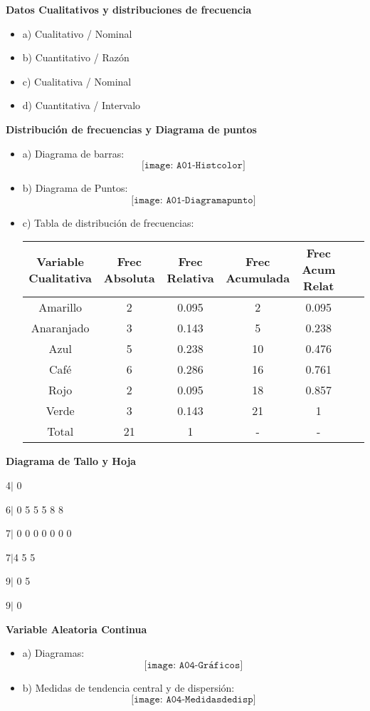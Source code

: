 \documentclass{../oxmathproblems}
\begin{document}
\begin{questions}
\miquestion \textbf{Datos Cualitativos y distribuciones de frecuencia}

\begin{itemize}
\item  a) Cualitativo / Nominal 
\item  b) Cuantitativo / Razón
\item  c) Cualitativa / Nominal 
\item  d) Cuantitativa / Intervalo
\end{itemize}

\miquestion \textbf {Distribución de frecuencias y Diagrama de puntos}

\begin{itemize}
\item  a) Diagrama de barras: 
$$\texttt{[image: A01-Histcolor]}$$
\item  b) Diagrama de Puntos: 
$$\texttt{[image: A01-Diagramapunto]}$$
\newpage
\item  c) Tabla de distribución de frecuencias: 
\begin{center}
\begin{tabular}{ |c|c|c|c|c|c|c|} 
\hline
Variable Cualitativa & Frec Absoluta & Frec Relativa & Frec Acumulada & Frec Acum Relat   \\
\hline
Amarillo &2 &0.095 & 2 & 0.095\\
Anaranjado &3& 0.143 & 5 & 0.238\\
Azul  & 5  & 0.238  & 10 & 0.476\\
Café & 6 & 0.286 &  16 &0.761\\
Rojo & 2 & 0.095 & 18 & 0.857\\
Verde & 3 & 0.143 & 21 & 1 \\
Total & 21 & 1 &- & - \\
\hline
\end{tabular}
\end{center}
\end{itemize}

\miquestion \textbf { Diagrama de Tallo y Hoja} 

4$\mid$ 0 

6$\mid$ 0 5 5 5 8 8 

7$\mid$ 0 0 0 0 0 0 0 

7$\mid$4  5 5 

9$\mid$ 0 5 

 9$\mid$ 0 


\miquestion \textbf { Variable Aleatoria Continua } 


\begin{itemize}
\item  a) Diagramas: 
$$\texttt{[image: A04-Gráficos]}$$
\item  b) Medidas de tendencia central y de dispersión: 
$$\texttt{[image: A04-Medidasdedisp]}$$
\end{itemize}

\end{questions}
\end{document}
